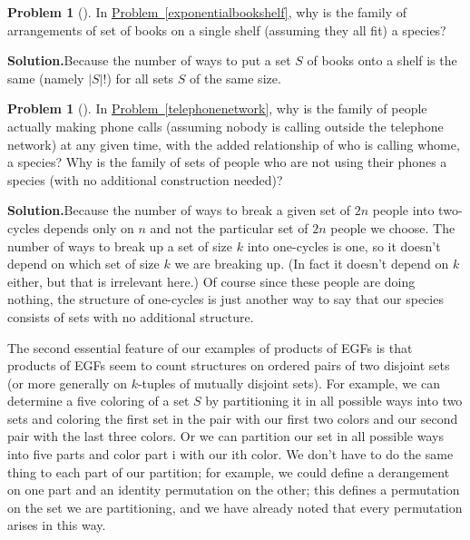 \documentclass[10pt,]{book}
\theoremstyle{plain}
\theoremstyle{definition}
\newtheorem{activity}[project]{Problem}
\theoremstyle{definition}
\numberwithin{equation}{chapter}
\begin{document}
\begin{activity}[]\label{activity-394}
In \hyperref[exponentialbookshelf]{Problem~\ref{exponentialbookshelf}}, why is the family of arrangements of set of books on a single shelf (assuming they all fit) a species?%
\par\medskip\noindent%
\textbf{Solution.}\quad Because the number of ways to put a set \(S\) of books onto a shelf is the same (namely \(|S|!\)) for all sets \(S\) of the same size.%
\end{activity}
\begin{activity}[]\label{activity-395}
In \hyperref[telephonenetwork]{Problem~\ref{telephonenetwork}}, why is the family of people actually making phone calls (assuming nobody is calling outside the telephone network) at any given time, with the added relationship of who is calling whome, a species? Why is the family of sets of people who are not using their phones a species (with no additional construction needed)?%
\par\medskip\noindent%
\textbf{Solution.}\quad Because the number of ways to break a given set of \(2n\) people into two-cycles depends only on \(n\) and not the particular set of \(2n\) people we choose. The number of ways to break up a set of size \(k\) into one-cycles is one, so it doesn't depend on which set of size \(k\) we are breaking up. (In fact it doesn't depend on \(k\) either, but that is irrelevant here.) Of course since these people are doing nothing, the structure of one-cycles is just another way to say that our species consists of sets with no additional structure.%
\end{activity}
The second essential feature of our examples of products of EGFs is that products of EGFs seem to count structures on ordered pairs of two disjoint sets (or more generally on \(k\)-tuples of mutually disjoint sets). For example, we can determine a five coloring of a set \(S\) by partitioning it in all possible ways into two sets and coloring the first set in the pair with our first two colors and our second pair with the last three colors. Or we can partition our set in all possible ways into five parts and color part i with our ith color. We don't have to do the same thing to each part of our partition; for example, we could define a derangement on one part and an identity permutation on the other; this defines a permutation on the set we are partitioning, and we have already noted that every permutation arises in this way.%
\par
\end{document}
